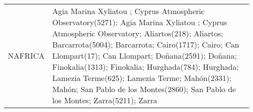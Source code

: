 \documentclass[journal abbreviation, manuscript]{copernicus}
\begin{document}
\begin{table}
\begin{tabularx}{\textwidth}{lX}
  NAFRICA  & Agia Marina Xyliatou ; Cyprus Atmospheric Observatory(5271); Agia Marina Xyliatou ; Cyprus Atmospheric Observatory; Aliartos(218); Aliartos; Barcarrota(5004); Barcarrota; Cairo(1717); Cairo; Can Llompart(17); Can Llompart; Doñana(2591); Doñana; Finokalia(1313); Finokalia; Hurghada(784); Hurghada; Lamezia Terme(625); Lamezia Terme; Mahón(2331); Mahón; San Pablo de los Montes(2860); San Pablo de los Montes; Zarra(5211); Zarra                                                                                                                                                                                                                                                                                                                                                                                                                                                                                                                                                                                                                                                                                                                                                                                                                                                                                                                                                                                                                                                                                                                                                                                                                                                                                                                                                                                                                                                                                                                                                                                                                                                                                                                                                                                                                                                                                                                                                                                                                                                                                                                                                                                                                                                                                                                                                                                                                                                                                                                                                                                                                                                                                                                                                                                                                                                                                                                                                                 
\end{tabularx}
\end{table}
\end{document}
